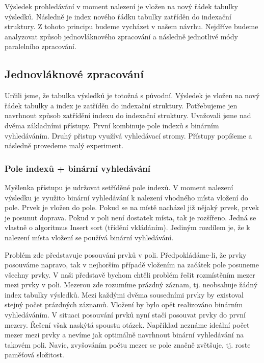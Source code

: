 Výsledek prohledávání v moment nalezení je vložen na nový řádek tabulky výsledků.
Následně je index nového řádku tabulky zatříděn do indexační struktury.
Z tohoto principu budeme vycházet v našem návrhu.
Nejdříve budeme analyzovat způsob jednovláknového zpracování a následně jednotlivé módy paralelního zpracování.

\subsection{Jednovláknové zpracování} \label{anal.ordeby.single}

Určili jsme, že tabulka výsledků je totožná s původní.
Výsledek je vložen na nový řádek tabulky a index je zatříděn do indexační struktury.
Potřebujeme jen navrhnout způsob zatřídění indexu do indexační struktury.
Uvažovali jsme nad dvěma základními přístupy.
První kombinuje pole indexů s binárním vyhledáváním.
Druhý přistup využívá vyhledávací stromy.
Přístupy popíšeme a následně provedeme malý experiment.

\subsubsection{Pole indexů + binární vyhledávání}

Myšlenka přístupu je udržovat setříděné pole indexů. 
V moment nalezení výsledku je využito binární vyhledávání \citep[str. 26]{labyrint} k nalezení vhodného místa vložení do pole.
Prvek je vložen do pole.
Pokud se na místě nacházel již nějaký prvek, prvek je posunut doprava.
Pokud v poli není dostatek místa, tak je rozšířeno.
Jedná se vlastně o algoritmus Insert sort (třídění vkládáním).
Jediným rozdílem je, že k nalezení místa vložení se používá binární vyhledávání.

Problém zde představuje posouvání prvků v poli.
Předpokládáme-li, že prvky posouváme napravo, tak v nejhorším případě vložením na začátek pole posuneme všechny prvky.
V naši představě bychom chtěli problém řešit rozmístěním mezer mezi prvky v poli.
Mezerou zde rozumíme prázdný záznam, tj. neobsahuje žádný index tabulky výsledků.
Mezi každými dvěma sousedními prvky by existoval stejný počet prázdných záznamů.
Vložení by bylo opět realizováno binárním vyhledáváním.
V situaci posouvání prvků nyní stačí posouvat prvky do první mezery.
Řešení však naskýtá spoustu otázek.
Například neznáme ideální počet mezer mezi prvky a nevíme jak optimálně navrhnout binární vyhledávání na takovém poli.
Navíc, zvyšováním počtu mezer se pole značně zvětšuje, tj. roste paměťová složitost.

